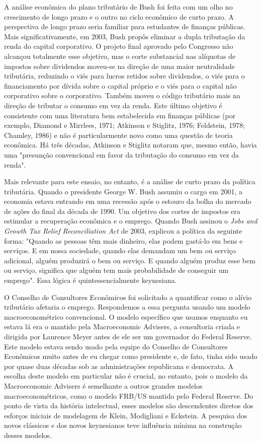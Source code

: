 \documentclass[12pt]{article}
\begin{document}
A análise econômica do plano tributário de Bush foi feita com um olho no crescimento de longo prazo e o outro no ciclo econômico de curto prazo. A perspectiva de longo prazo seria familiar para estudantes de finanças públicas. Mais significativamente, em 2003, Bush propôs eliminar a dupla tributação da renda do capital corporativo. O projeto final aprovado pelo Congresso não alcançou totalmente esse objetivo, mas o corte substancial nas alíquotas de impostos sobre dividendos moveu-se na direção de uma maior neutralidade tributária, reduzindo o viés para lucros retidos sobre dividendos, o viés para o financiamento por dívida sobre o capital próprio e o viés para o capital não corporativo sobre o corporativo. Também moveu o código tributário mais na direção de tributar o consumo em vez da renda. Este último objetivo é consistente com uma literatura bem estabelecida em finanças públicas (por exemplo, Diamond e Mirrlees, 1971; Atkinson e Stiglitz, 1976; Feldstein, 1978; Chamley, 1986) e não é particularmente novo como uma questão de teoria econômica. Há três décadas, Atkinson e Stiglitz notaram que, mesmo então, havia uma "presunção convencional em favor da tributação do consumo em vez da renda".

Mais relevante para este ensaio, no entanto, é a análise de curto prazo da política tributária. Quando o presidente George W. Bush assumiu o cargo em 2001, a economia estava entrando em uma recessão após o estouro da bolha do mercado de ações do final da década de 1990. Um objetivo dos cortes de impostos era estimular a recuperação econômica e o emprego. Quando Bush assinou o \textit{Jobs and Growth Tax Relief Reconciliation Act} de 2003, explicou a política da seguinte forma: "Quando as pessoas têm mais dinheiro, elas podem gastá-lo em bens e serviços. E em nossa sociedade, quando elas demandam um bem ou serviço adicional, alguém produzirá o bem ou serviço. E quando alguém produz esse bem ou serviço, significa que alguém tem mais probabilidade de conseguir um emprego". Essa lógica é quintessencialmente keynesiana.

O Conselho de Consultores Econômicos foi solicitado a quantificar como o alívio tributário afetaria o emprego. Respondemos a essa pergunta usando um modelo macroeconométrico convencional. O modelo específico que usamos enquanto eu estava lá era o mantido pela Macroeconomic Advisers, a consultoria criada e dirigida por Laurence Meyer antes de ele ser um governador do Federal Reserve. Este modelo estava sendo usado pela equipe do Conselho de Consultores Econômicos muito antes de eu chegar como presidente e, de fato, tinha sido usado por quase duas décadas sob as administrações republicana e democrata. A escolha deste modelo em particular não é crucial, no entanto, pois o modelo da Macroeconomic Advisers é semelhante a outros grandes modelos macroeconométricos, como o modelo FRB/US mantido pelo Federal Reserve. Do ponto de vista da história intelectual, esses modelos são descendentes diretos dos esforços iniciais de modelagem de Klein, Modigliani e Eckstein. A pesquisa dos novos clássicos e dos novos keynesianos teve influência mínima na construção desses modelos.
\end{document}
